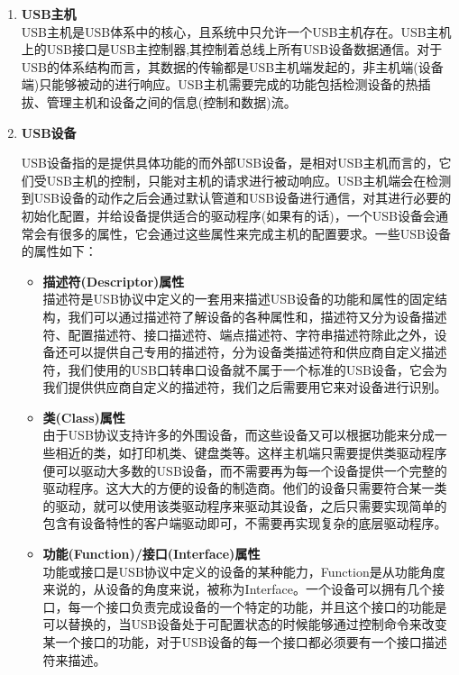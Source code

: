 \begin{enumerate}
\item \textbf{USB主机}\\
	USB主机是USB体系中的核心，且系统中只允许一个USB主机存在。USB主机上的USB接口是USB主控制器,其控制着总线上所有USB设备数据通信。对于USB的体系结构而言，其数据的传输都是USB主机端发起的，非主机端(设备端)只能够被动的进行响应。USB主机需要完成的功能包括检测设备的热插拔、管理主机和设备之间的信息(控制和数据)流\cite{李雪红2004USB}\cite{莫宏伟2001USB}。



\item \textbf{USB设备}

	USB设备指的是提供具体功能的而外部USB设备，是相对USB主机而言的，它们受USB主机的控制，只能对主机的请求进行被动响应。USB主机端会在检测到USB设备的动作之后会通过默认管道和USB设备进行通信，对其进行必要的初始化配置，并给设备提供适合的驱动程序(如果有的话)，一个USB设备会通常会有很多的属性，它会通过这些属性来完成主机的配置要求。一些USB设备的属性如下：
	\begin{itemize}
	\item \textbf{描述符(Descriptor)属性}\\
	描述符是USB协议中定义的一套用来描述USB设备的功能和属性的固定结构，我们可以通过描述符了解设备的各种属性和，描述符又分为设备描述符、配置描述符、接口描述符、端点描述符、字符串描述符\cite{张杰2008基于}\cite{边海龙2004USB}除此之外，设备还可以提供自己专用的描述符，分为设备类描述符和供应商自定义描述符，我们使用的USB口转串口设备就不属于一个标准的USB设备，它会为我们提供供应商自定义的描述符，我们之后需要用它来对设备进行识别。
	
	\item \textbf{类(Class)属性}\\
	由于USB协议支持许多的外围设备，而这些设备又可以根据功能来分成一些相近的类，如打印机类、键盘类等。这样主机端只需要提供类驱动程序便可以驱动大多数的USB设备，而不需要再为每一个设备提供一个完整的驱动程序。这大大的方便的设备的制造商。他们的设备只需要符合某一类的驱动，就可以使用该类驱动程序来驱动其设备，之后只需要实现简单的包含有设备特性的客户端驱动即可，不需要再实现复杂的底层驱动程序\cite{李雪红2004USB}。	
	
	\item \textbf{功能(Function)/接口(Interface)属性}\\
	功能或接口是USB协议中定义的设备的某种能力，Function是从功能角度来说的，从设备的角度来说，被称为Interface。一个设备可以拥有几个接口，每一个接口负责完成设备的一个特定的功能，并且这个接口的功能是可以替换的，当USB设备处于可配置状态的时候能够通过控制命令来改变某一个接口的功能，对于USB设备的每一个接口都必须要有一个接口描述符来描述。
	

\end{itemize}
\end{enumerate}
